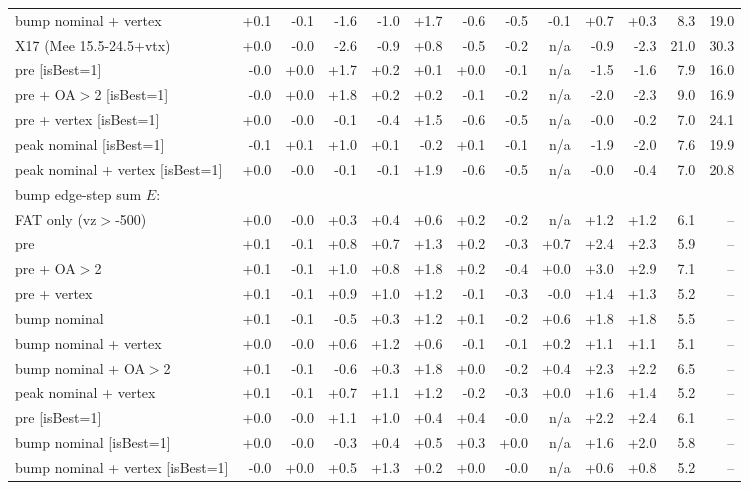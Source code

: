 \begin{table}[H]
{\begin{tabular}{lrrrrrrrrrrrr}
bump nominal + vertex & +0.1 & -0.1 & -1.6 & -1.0 & +1.7 & -0.6 & -0.5 & -0.1 & +0.7 & +0.3 & 8.3 & 19.0\\
X17 (Mee 15.5-24.5+vtx) & +0.0 & -0.0 & -2.6 & -0.9 & +0.8 & -0.5 & -0.2 & n/a & -0.9 & -2.3 & 21.0 & 30.3\\
pre [isBest=1] & -0.0 & +0.0 & +1.7 & +0.2 & +0.1 & +0.0 & -0.1 & n/a & -1.5 & -1.6 & 7.9 & 16.0\\
pre + OA$>$2 [isBest=1] & -0.0 & +0.0 & +1.8 & +0.2 & +0.2 & -0.1 & -0.2 & n/a & -2.0 & -2.3 & 9.0 & 16.9\\
pre + vertex [isBest=1] & +0.0 & -0.0 & -0.1 & -0.4 & +1.5 & -0.6 & -0.5 & n/a & -0.0 & -0.2 & 7.0 & 24.1\\
peak nominal [isBest=1] & -0.1 & +0.1 & +1.0 & +0.1 & -0.2 & +0.1 & -0.1 & n/a & -1.9 & -2.0 & 7.6 & 19.9\\
peak nominal + vertex [isBest=1] & +0.0 & -0.0 & -0.1 & -0.1 & +1.9 & -0.6 & -0.5 & n/a & -0.0 & -0.4 & 7.0 & 20.8\\
\midrule
\multicolumn{13}{l}{bump edge-step sum $E$:}\\
FAT only (vz$>$-500) & +0.0 & -0.0 & +0.3 & +0.4 & +0.6 & +0.2 & -0.2 & n/a & +1.2 & +1.2 & 6.1 & --\\
pre & +0.1 & -0.1 & +0.8 & +0.7 & +1.3 & +0.2 & -0.3 & +0.7 & +2.4 & +2.3 & 5.9 & --\\
pre + OA$>$2 & +0.1 & -0.1 & +1.0 & +0.8 & +1.8 & +0.2 & -0.4 & +0.0 & +3.0 & +2.9 & 7.1 & --\\
pre + vertex & +0.1 & -0.1 & +0.9 & +1.0 & +1.2 & -0.1 & -0.3 & -0.0 & +1.4 & +1.3 & 5.2 & --\\
bump nominal & +0.1 & -0.1 & -0.5 & +0.3 & +1.2 & +0.1 & -0.2 & +0.6 & +1.8 & +1.8 & 5.5 & --\\
bump nominal + vertex & +0.0 & -0.0 & +0.6 & +1.2 & +0.6 & -0.1 & -0.1 & +0.2 & +1.1 & +1.1 & 5.1 & --\\
bump nominal + OA$>$2 & +0.1 & -0.1 & -0.6 & +0.3 & +1.8 & +0.0 & -0.2 & +0.4 & +2.3 & +2.2 & 6.5 & --\\
peak nominal + vertex & +0.1 & -0.1 & +0.7 & +1.1 & +1.2 & -0.2 & -0.3 & +0.0 & +1.6 & +1.4 & 5.2 & --\\
pre [isBest=1] & +0.0 & -0.0 & +1.1 & +1.0 & +0.4 & +0.4 & -0.0 & n/a & +2.2 & +2.4 & 6.1 & --\\
bump nominal [isBest=1] & +0.0 & -0.0 & -0.3 & +0.4 & +0.5 & +0.3 & +0.0 & n/a & +1.6 & +2.0 & 5.8 & --\\
bump nominal + vertex [isBest=1] & -0.0 & +0.0 & +0.5 & +1.3 & +0.2 & +0.0 & -0.0 & n/a & +0.6 & +0.8 & 5.2 & --\\

\end{tabular}}
\end{table}
